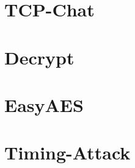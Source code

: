 \documentclass[a4paper,12bpt]{scrartcl}
\begin{document}
\begin{appendices}
    \section{TCP-Chat}
    \label{sec:TCP-Chat}
    
    
    

    \section{Decrypt}
    \label{sec:Decrypt}
    
    

    \section{EasyAES}
    \label{sec:EasyAES}
    

    \section{Timing-Attack}
    \label{sec:timing_code}
    
    
\end{appendices}
\end{document}
